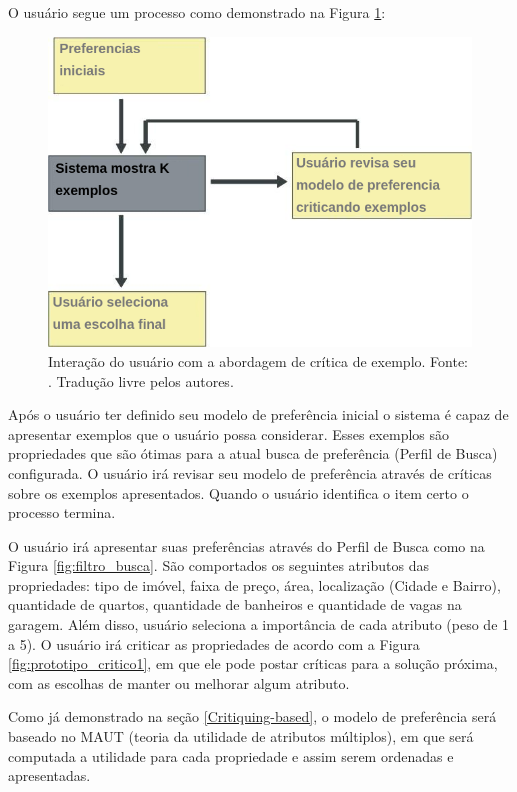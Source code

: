 O usuário segue um processo como demonstrado na Figura \ref{fig:exemple-critiquing}:

\begin{figure}[H]
    \centering
    \includegraphics[scale=0.5]{figuras/proposta/exemple-critiquing.png}
    \caption[Interação do usuário com a abordagem de crítica de exemplo]{Interação do usuário com a abordagem de crítica de exemplo. Fonte: \cite{Viappiani}. Tradução livre pelos autores.}
    \label{fig:exemple-critiquing}
\end{figure}

Após o usuário ter definido seu modelo de preferência inicial o sistema é capaz de apresentar exemplos que o usuário possa considerar. Esses exemplos são propriedades que são ótimas para a atual busca de preferência (Perfil de Busca) configurada. O usuário irá revisar seu modelo de preferência através de críticas sobre os exemplos apresentados. Quando o usuário identifica o item certo o processo termina.

O usuário irá apresentar suas preferências através do Perfil de Busca como na Figura \ref{fig:filtro_busca}. São comportados os seguintes atributos das propriedades: tipo de imóvel, faixa de preço, área, localização (Cidade e Bairro), quantidade de quartos, quantidade de banheiros e quantidade de vagas na garagem. Além disso, usuário seleciona a importância de cada atributo (peso de 1 a 5). O usuário irá criticar as propriedades de acordo com a Figura \ref{fig:prototipo_critico1}, em que ele pode postar críticas para a solução próxima, com as escolhas de manter ou melhorar algum atributo.

Como já demonstrado na seção \ref{Critiquing-based}, o modelo de preferência será baseado no MAUT (teoria da utilidade de atributos múltiplos), em que será computada a utilidade para cada propriedade e assim serem ordenadas e apresentadas.


